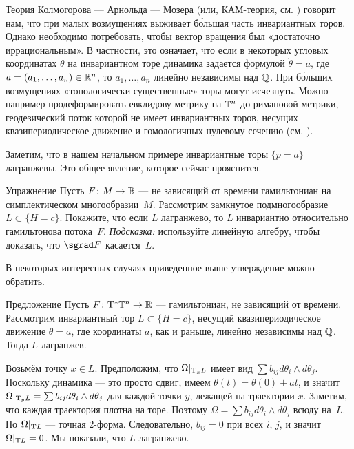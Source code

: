Теория Колмогорова — Арнольда — Мозера (или, КАМ-теория, см. \cite{Ar})
говорит нам, что при малых возмущениях выживает б\'{о}льшая часть
инвариантных торов. 
Однако необходимо потребовать, чтобы вектор вращения был «достаточно
иррациональным». 
В частности, это означает, что если в некоторых угловых координатах
$\theta$ на инвариантном торе динамика задается формулой $\dot\theta =
a$, где $a = (a_1 ,\dots, a_n) \in \mathbb{R}^n$, то $a_1 ,\dots, a_n$ линейно независимы над $\mathbb{Q}$. 
При б\'{о}льших возмущениях «топологически существенные» торы могут исчезнуть.
Можно например продеформировать евклидову метрику на $\mathbb{T}^n$ до римановой метрики, геодезический поток которой не имеет инвариантных торов, несущих квазипериодическое движение и гомологичных нулевому сечению (см. \cite{AL}). 

Заметим, что в нашем начальном примере инвариантные торы $\{p = a\}$
лагранжевы. 
Это общее явление, которое сейчас прояснится.

\begin{ex}{Упражнение}\label{8.1.A}
Пусть $F\colon M \to \mathbb{R}$ — не зависящий от времени гамильтониан на симплектическом многообразии~$M$.
Рассмотрим замкнутое подмногообразие $L \subset \{H = c\}$.
Покажите, что если $L$ лагранжево, то $L$ инвариантно относительно гамильтонова потока~$F$.
\emph{Подсказка:} используйте линейную алгебру, чтобы доказать, что $\sgrad F$ касается~$L$.
\end{ex}

В некоторых интересных случаях приведенное выше утверждение можно обратить.

\begin{thm}[(\cite{He})]{Предложение}\label{8.1.B}
Пусть $F\colon \mathrm{T}^\ast \mathbb{T}^n \to \mathbb{R}$ — гамильтониан, не зависящий от времени.
Рассмотрим инвариантный тор $L \subset \{H = c\}$, несущий квазипериодическое движение $\dot\theta = a$, где координаты $a$, как и раньше, линейно независимы над $\mathbb{Q}$.
Тогда $L$ лагранжев.
\end{thm}

Возьмём точку $x \in L$.
Предположим, что $\Omega|_{\mathrm{T}_x L}$ имеет вид $\sum b_{ij} d\theta_i
\wedge d\theta_j$. 
Поскольку динамика — это просто сдвиг, имеем $\theta (t) = \theta
(0) + at$, и значит $\Omega|_{\mathrm{T}_y L} = \sum b_{ij} d\theta_i \wedge d\theta_j$ для каждой точки $y$, лежащей на траектории $x$. 
Заметим, что каждая траектория плотна на торе.
Поэтому $\Omega = \sum b_{ij} d\theta_i \wedge d\theta_j$ всюду на~$L$.
Но $\Omega|_{\mathrm{T} L}$ — точная 2-форма.
Следовательно, $b_{ij} = 0$ при всех $i$, $j$, и значит $\Omega|_{\mathrm{T} L} = 0$. 
Мы показали, что $L$ лагранжево.
\qeds

